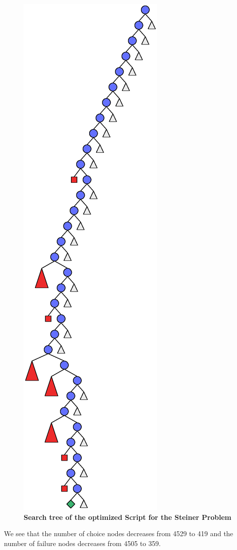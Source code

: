 \documentclass[a4paper]{scrartcl}
\begin{document}
\begin{figure}[htpb]
\centerline{\includegraphics*[scale=0.3]{figs2/steiner2.eps}}
\caption{{\bf Search tree of the optimized Script for the Steiner Problem}}
\label{figure 14}
\end{figure}
We see that the number of choice nodes decreases from 
4529 to 419 and the number of failure nodes decreases from 
4505 to 359.
\end{document}
